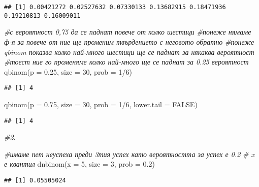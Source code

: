 \documentclass[
]{article}
\newenvironment{Shaded}{\begin{snugshade}}{\end{snugshade}}
\newcommand{\AttributeTok}[1]{\textcolor[rgb]{0.77,0.63,0.00}{#1}}
\newcommand{\CommentTok}[1]{\textcolor[rgb]{0.56,0.35,0.01}{\textit{#1}}}
\newcommand{\ConstantTok}[1]{\textcolor[rgb]{0.00,0.00,0.00}{#1}}
\newcommand{\DecValTok}[1]{\textcolor[rgb]{0.00,0.00,0.81}{#1}}
\newcommand{\FloatTok}[1]{\textcolor[rgb]{0.00,0.00,0.81}{#1}}
\newcommand{\FunctionTok}[1]{\textcolor[rgb]{0.00,0.00,0.00}{#1}}
\newcommand{\NormalTok}[1]{#1}
\newcommand{\SpecialCharTok}[1]{\textcolor[rgb]{0.00,0.00,0.00}{#1}}
\begin{document}
\begin{verbatim}
## [1] 0.00421272 0.02527632 0.07330133 0.13682915 0.18471936 0.19210813 0.16009011
\end{verbatim}

\begin{Shaded}
\begin{Highlighting}[]
\CommentTok{\#с вероятност 0,75 да се паднат повече от колко шестици}
\CommentTok{\#понеже нямаме ф{-}я за повече от ние ще променим твърдението с неговото обратно}
\CommentTok{\#понеже qbinom показва колко най{-}много шестици ще се паднат за някаква вероятност}
\CommentTok{\#тоест ние го променяме колко най{-}много ще се паднат за 0.25 вероятност}
\FunctionTok{qbinom}\NormalTok{(}\AttributeTok{p =} \FloatTok{0.25}\NormalTok{, }\AttributeTok{size =} \DecValTok{30}\NormalTok{, }\AttributeTok{prob =} \DecValTok{1}\SpecialCharTok{/}\DecValTok{6}\NormalTok{)}
\end{Highlighting}
\end{Shaded}

\begin{verbatim}
## [1] 4
\end{verbatim}

\begin{Shaded}
\begin{Highlighting}[]
\FunctionTok{qbinom}\NormalTok{(}\AttributeTok{p =} \FloatTok{0.75}\NormalTok{, }\AttributeTok{size =} \DecValTok{30}\NormalTok{, }\AttributeTok{prob =} \DecValTok{1}\SpecialCharTok{/}\DecValTok{6}\NormalTok{, }\AttributeTok{lower.tail =} \ConstantTok{FALSE}\NormalTok{)}
\end{Highlighting}
\end{Shaded}

\begin{verbatim}
## [1] 4
\end{verbatim}

\begin{Shaded}
\begin{Highlighting}[]
\CommentTok{\#2.}

\CommentTok{\#имаме пет неуспеха преди 3тия успех като вероятността за успех е 0.2}
\CommentTok{\# x е квантил}
\FunctionTok{dnbinom}\NormalTok{(}\AttributeTok{x =} \DecValTok{5}\NormalTok{, }\AttributeTok{size =} \DecValTok{3}\NormalTok{, }\AttributeTok{prob =} \FloatTok{0.2}\NormalTok{)}
\end{Highlighting}
\end{Shaded}

\begin{verbatim}
## [1] 0.05505024
\end{verbatim}
\end{document}
